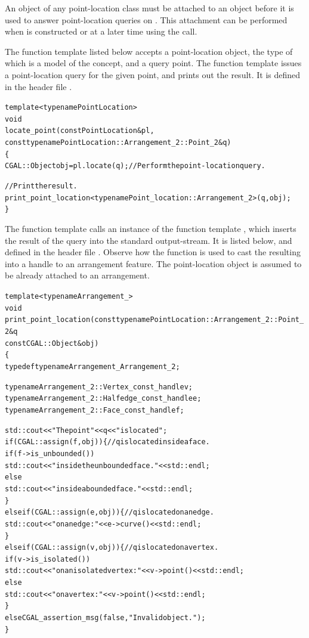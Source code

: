 An object  of any point-location class must be attached to an
 object  before it is used to answer
point-location queries on . This attachment can be performed
when  is constructed or at a later time using the
 call.

The function template listed below accepts a point-location object,
the type of which is a model of the 
concept, and a query point. The function template issues a
point-location query for the given point, and prints out the result.
It is defined in the header file .

\label{lst:pl}
\begin{alltt}
template <typename PointLocation>
void
locate_point(const PointLocation& pl,
             const typename PointLocation::Arrangement_2::Point_2& q)
\{
  CGAL::Object obj = pl.locate(q);    // Perform the point-location query.

  // Print the result.
  print_point_location<typename Point_location::Arrangement_2>(q, obj);
\}
\end{alltt}

The function template  calls an instance of the
function template , which inserts the
result of the query into the standard output-stream. It is listed
below, and defined in the header file .
Observe how the function  is used to cast the
resulting  into a handle to an arrangement feature.
The point-location object  is assumed to be already attached
to an arrangement.

\begin{alltt}
template <typename Arrangement_>
void
print_point_location(const typename PointLocation::Arrangement_2::Point_2& q
                    const CGAL::Object& obj)
\{
  typedef typename Arrangement_                 Arrangement_2;

  typename Arrangement_2::Vertex_const_handle    v;
  typename Arrangement_2::Halfedge_const_handle  e;
  typename Arrangement_2::Face_const_handle      f;

  std::cout << "The point " << q << " is located ";
  if (CGAL::assign (f, obj)) \{        // q is located inside a face.
    if (f->is_unbounded())
      std::cout << "inside the unbounded face." << std::endl;
    else
      std::cout << "inside a bounded face." << std::endl;
  \}
  else if (CGAL::assign (e, obj)) \{   // q is located on an edge.
    std::cout << "on an edge: " << e->curve() << std::endl;
  \}
  else if (CGAL::assign (v, obj)) \{   // q is located on a vertex.
    if (v->is_isolated())
      std::cout << "on an isolated vertex: " << v->point() << std::endl;
    else
      std::cout << "on a vertex: " << v->point() << std::endl;
  \}
  else CGAL_assertion_msg (false, "Invalid object.");
\}
\end{alltt}

